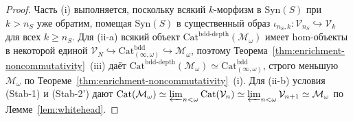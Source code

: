 \documentclass[11pt]{article}
\theoremstyle{plain}
\theoremstyle{definition}
\newcommand{\Cat}{\mathrm{Cat}}
\newcommand{\Syn}{\mathrm{Syn}}
\begin{document}
\begin{proof}
Часть (i) выполняется, поскольку всякий $k$-морфизм в $\Syn(S)$ при $k > n_S$ уже обратим, помещая $\Syn(S)$ в существенный образ $\iota_{n_S, k} : \mathcal{V}_{n_S} \hookrightarrow \mathcal{V}_k$ для всех $k \ge n_S$. Для (ii-a) всякий объект $\Cat^{\mathrm{bdd\text{-}depth}}(\mathcal{M}_\omega)$ имеет hom-объекты в некоторой единой $\mathcal{V}_N \hookrightarrow \Cat_{(\infty,\omega)}^{\mathrm{bdd}} \hookrightarrow \mathcal{M}_\omega$, поэтому Теорема~\ref{thm:enrichment-noncommutativity}~(iii) даёт $\Cat^{\mathrm{bdd\text{-}depth}}(\mathcal{M}_\omega) \simeq \Cat_{(\infty,\omega)}^{\mathrm{bdd}}$, строго меньшую $\mathcal{M}_\omega$ по Теореме~\ref{thm:enrichment-noncommutativity}~(i). Для (ii-b) условия \textup{(Stab-1)} и \textup{(Stab-2')} дают $\Cat(\mathcal{M}_\omega) \simeq \varprojlim_{n < \omega} \Cat(\mathcal{V}_n) \simeq \varprojlim_{n < \omega} \mathcal{V}_{n+1} \simeq \mathcal{M}_\omega$ по Лемме~\ref{lem:whitehead}.
\end{proof}
\end{document}
